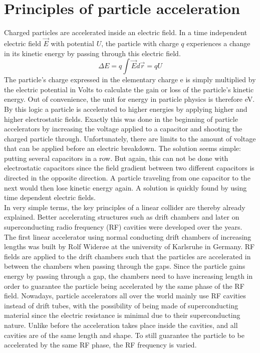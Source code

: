 \section{Principles of particle acceleration}
\label{AcceleratorPhysics}
Charged particles are accelerated inside an electric field. 
In a time independent electric field $\vec{E}$ with potential $U$, the particle with charge $q$ experiences a change in its kinetic energy by passing through this electric field.
\begin{equation}
 \Delta E = q \int \vec{E}d\vec{r} = qU
\end{equation}
The particle's charge expressed in the elementary charge e is simply multiplied by the electric potential in Volts to calculate the gain or loss of the particle's kinetic energy. 
Out of convenience, the unit for energy in particle physics is therefore eV.\\
By this logic a particle is accelerated to higher energies by applying higher and higher electrostatic fields. 
Exactly this was done in the beginning of particle accelerators by increasing the voltage applied to a capacitor and shooting the charged particle through. 
Unfortunately, there are limits to the amount of voltage that can be applied before an electric breakdown.
The solution seems simple: putting several capacitors in a row.
But again, this can not be done with electrostatic capacitors since the field gradient between two different capacitors is directed in the opposite direction.
A particle traveling from one capacitor to the next would then lose kinetic energy again.
A solution is quickly found by using time dependent electric fields.\\
In very simple terms, the key principles of a linear collider are thereby already explained.
Better accelerating structures such as drift chambers and later on superconducting radio frequency (RF) cavities were developed over the years.
The first linear accelerator using normal conducting drift chambers of increasing lengths was built by Rolf Wider\o e at the university of Karlsruhe in Germany.
RF fields are applied to the drift chambers such that the particles are accelerated in between the chambers when passing through the gaps.
Since the particle gains energy by passing through a gap, the chambers need to have increasing length in order to guarantee the particle being accelerated by the same phase of the RF field.
Nowadays, particle accelerators all over the world mainly use RF cavities instead of drift tubes, with the possibility of being made of superconducting material since the electric resistance is minimal due to their superconducting nature.
Unlike before the acceleration takes place inside the cavities, and all cavities are of the same length and shape.
To still guarantee the particle to be accelerated by the same RF phase, the RF frequency is varied.

